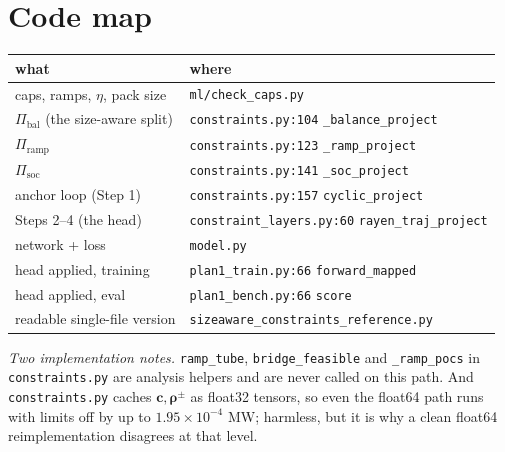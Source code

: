 \documentclass[11pt]{article}
\begin{document}
\section{Code map}

\begin{center}
\begin{tabular}{ll}
\toprule
what & where \\
\midrule
caps, ramps, $\eta$, pack size & \texttt{ml/check\_caps.py} \\
$\Pi_{\mathrm{bal}}$ (the size-aware split) & \texttt{constraints.py:104} \texttt{\_balance\_project} \\
$\Pi_{\mathrm{ramp}}$ & \texttt{constraints.py:123} \texttt{\_ramp\_project} \\
$\Pi_{\mathrm{soc}}$ & \texttt{constraints.py:141} \texttt{\_soc\_project} \\
anchor loop (Step 1) & \texttt{constraints.py:157} \texttt{cyclic\_project} \\
Steps 2--4 (the head) & \texttt{constraint\_layers.py:60} \texttt{rayen\_traj\_project} \\
network + loss & \texttt{model.py} \\
head applied, training & \texttt{plan1\_train.py:66} \texttt{forward\_mapped} \\
head applied, eval & \texttt{plan1\_bench.py:66} \texttt{score} \\
readable single-file version & \texttt{sizeaware\_constraints\_reference.py} \\
\bottomrule
\end{tabular}
\end{center}

\noindent
\emph{Two implementation notes.} \texttt{ramp\_tube}, \texttt{bridge\_feasible}
and \texttt{\_ramp\_pocs} in \texttt{constraints.py} are analysis helpers and are
never called on this path. And \texttt{constraints.py} caches
$\mathbf{c},\bm{\rho}^{\pm}$ as float32 tensors, so even the float64 path runs
with limits off by up to $1.95\times10^{-4}$ MW; harmless, but it is why a clean
float64 reimplementation disagrees at that level.
\end{document}
